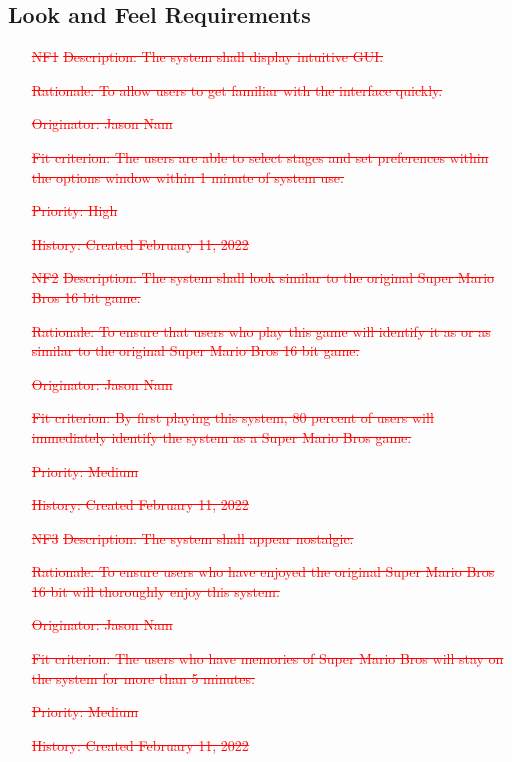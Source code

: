 \documentclass[12pt, titlepage]{article}
\begin{document}
\subsection{Look and Feel Requirements}
\begin{itemize}

	\item[\textcolor{red}{\st{NF1}}]
        \textcolor{red}{\st{Description: The system shall display intuitive GUI.}}

        \textcolor{red}{\st{Rationale: To allow users to get familiar with the interface quickly.}}

        \textcolor{red}{\st{Originator: Jason Nam}}

        \textcolor{red}{\st{Fit criterion: The users are able to select stages and set preferences within the options window within 1 minute of system use.}}

        \textcolor{red}{\st{Priority: High}}

        \textcolor{red}{\st{History: Created February 11, 2022}}

    \item[\textcolor{red}{\st{NF2}}]
        \textcolor{red}{\st{Description: The system shall look similar to the original Super Mario Bros 16 bit game.}}

        \textcolor{red}{\st{Rationale: To ensure that users who play this game will identify it as or as similar to the original Super Mario Bros 16 bit game.}}

        \textcolor{red}{\st{Originator: Jason Nam}}

        \textcolor{red}{\st{Fit criterion: By first playing this system, 80 percent of users will immediately identify the system as a Super Mario Bros game.}}

        \textcolor{red}{\st{Priority: Medium}}

        \textcolor{red}{\st{History: Created February 11, 2022}}

    \item[\textcolor{red}{\st{NF3}}]
        \textcolor{red}{\st{Description: The system shall appear nostalgic.}}

        \textcolor{red}{\st{Rationale: To ensure users who have enjoyed the original Super Mario Bros 16 bit will thoroughly enjoy this system.}}

        \textcolor{red}{\st{Originator: Jason Nam}}

        \textcolor{red}{\st{Fit criterion: The users who have memories of Super Mario Bros will stay on the system for more than 5 minutes.}}

        \textcolor{red}{\st{Priority: Medium}}

        \textcolor{red}{\st{History: Created February 11, 2022}}

\end{itemize}
\end{document}
